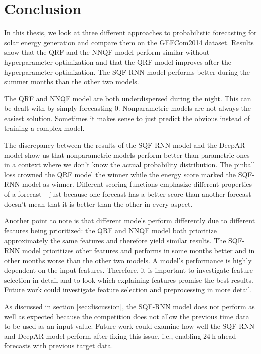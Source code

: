 \section{Conclusion}
\label{sec:conclusion}

In this thesis, we look at three different approaches to probabilistic forecasting 
for solar energy generation and compare them on the GEFCom2014 dataset. 
Results show that the QRF and the NNQF model perform similar without 
hyperparameter optimization and that the QRF model improves after the hyperparameter 
optimization. The SQF-RNN model performs better during the summer months than the other two models. 

The QRF and NNQF model are both underdispersed during the night. This can be dealt with by simply forecasting \(0\). 
Nonparametric models are not always the easiest solution. Sometimes it makes sense to just predict the obvious 
instead of training a complex model.

The discrepancy between the results of the SQF-RNN model and the DeepAR model show us that 
nonparametric models perform better than parametric ones in a context where we don't know the actual probability distribution. 
The pinball loss crowned the QRF model the winner while the energy score marked the SQF-RNN model as winner. 
Different scoring functions emphasize different properties of a forecast -- just because one forecast has a 
better score than another forecast doesn't mean that it is better than the other in every aspect.

Another point to note is that different models perform differently due to different features being 
prioritized: the QRF and NNQF model both prioritize approximately the same features and therefore 
yield similar results. The SQF-RNN model prioritizes other features and performs in some months better 
and in other months worse than the other two models. A model's performance is highly dependent on the input features.
Therefore, it is important to investigate feature selection in detail and to look which explaining features promise the best results. 
Future work could investigate feature selection and preprocessing in more detail. 

As discussed in section \ref{sec:discussion}, the SQF-RNN model does not perform as well as expected 
because the competition does not allow the previous time data to be used as an input value. 
Future work could examine how well the SQF-RNN and DeepAR model perform after fixing this issue, 
i.e., enabling \(\SI{24}{\hour}\) ahead forecasts with previous target data. 